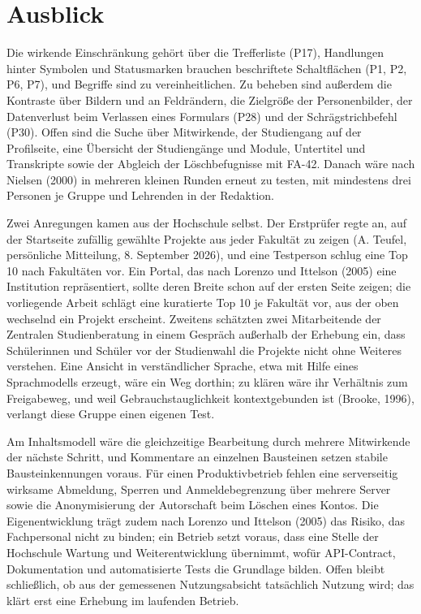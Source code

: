 \section{Ausblick}
\label{sec:ausblick}

Die wirkende Einschränkung gehört über die Trefferliste (P17), Handlungen hinter Symbolen und Statusmarken brauchen beschriftete Schaltflächen (P1, P2, P6, P7), und Begriffe sind zu vereinheitlichen. Zu beheben sind außerdem die Kontraste über Bildern und an Feldrändern, die Zielgröße der Personenbilder, der Datenverlust beim Verlassen eines Formulars (P28) und der Schrägstrichbefehl (P30). Offen sind die Suche über Mitwirkende, der Studiengang auf der Profilseite, eine Übersicht der Studiengänge und Module, Untertitel und Transkripte sowie der Abgleich der Löschbefugnisse mit FA-42. Danach wäre nach Nielsen (2000) in mehreren kleinen Runden erneut zu testen, mit mindestens drei Personen je Gruppe und Lehrenden in der Redaktion.

Zwei Anregungen kamen aus der Hochschule selbst. Der Erstprüfer regte an, auf der Startseite zufällig gewählte Projekte aus jeder Fakultät zu zeigen (A. Teufel, persönliche Mitteilung, 8. September 2026), und eine Testperson schlug eine Top 10 nach Fakultäten vor. Ein Portal, das nach Lorenzo und Ittelson (2005) eine Institution repräsentiert, sollte deren Breite schon auf der ersten Seite zeigen; die vorliegende Arbeit schlägt eine kuratierte Top 10 je Fakultät vor, aus der oben wechselnd ein Projekt erscheint. Zweitens schätzten zwei Mitarbeitende der Zentralen Studienberatung in einem Gespräch außerhalb der Erhebung ein, dass Schülerinnen und Schüler vor der Studienwahl die Projekte nicht ohne Weiteres verstehen. Eine Ansicht in verständlicher Sprache, etwa mit Hilfe eines Sprachmodells erzeugt, wäre ein Weg dorthin; zu klären wäre ihr Verhältnis zum Freigabeweg, und weil Gebrauchstauglichkeit kontextgebunden ist (Brooke, 1996), verlangt diese Gruppe einen eigenen Test.

Am Inhaltsmodell wäre die gleichzeitige Bearbeitung durch mehrere Mitwirkende der nächste Schritt, und Kommentare an einzelnen Bausteinen setzen stabile Bausteinkennungen voraus. Für einen Produktivbetrieb fehlen eine serverseitig wirksame Abmeldung, Sperren und Anmeldebegrenzung über mehrere Server sowie die Anonymisierung der Autorschaft beim Löschen eines Kontos. Die Eigenentwicklung trägt zudem nach Lorenzo und Ittelson (2005) das Risiko, das Fachpersonal nicht zu binden; ein Betrieb setzt voraus, dass eine Stelle der Hochschule Wartung und Weiterentwicklung übernimmt, wofür API-Contract, Dokumentation und automatisierte Tests die Grundlage bilden. Offen bleibt schließlich, ob aus der gemessenen Nutzungsabsicht tatsächlich Nutzung wird; das klärt erst eine Erhebung im laufenden Betrieb.
